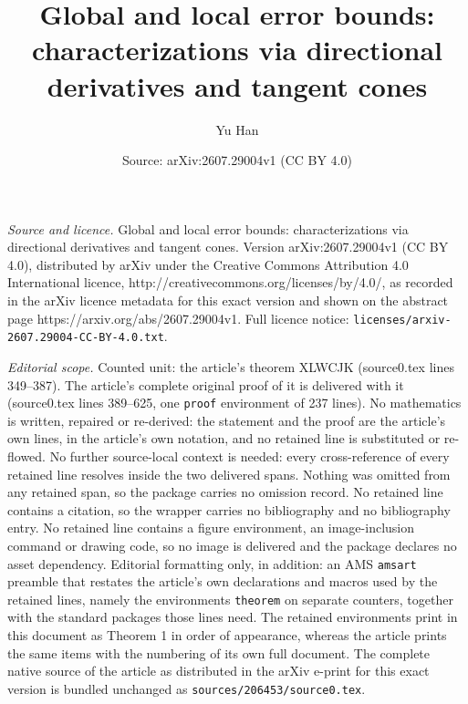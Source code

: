 \documentclass[10pt,a4paper]{amsart}
\title{{Global and local error bounds: characterizations via directional derivatives and tangent cones}}
\author{Yu Han}
\date{Source: arXiv:2607.29004v1 (CC BY 4.0)}
\begin{document}
\maketitle

\noindent\emph{Source and licence.} {Global and local error bounds: characterizations via directional derivatives and tangent cones}. Version arXiv:2607.29004v1 (CC BY 4.0), distributed by arXiv under the Creative Commons Attribution 4.0 International licence, http://creativecommons.org/licenses/by/4.0/, as recorded in the arXiv licence metadata for this exact version and shown on the abstract page https://arxiv.org/abs/2607.29004v1. Full licence notice: \texttt{licenses/arxiv-2607.29004-CC-BY-4.0.txt}.\par\smallskip

\noindent\textit{Editorial scope.} Counted unit: the article's theorem XLWCJK (source0.tex lines 349--387). The article's complete original proof of it is delivered with it (source0.tex lines 389--625, one \texttt{proof} environment of 237 lines). No mathematics is written, repaired or re-derived: the statement and the proof are the article's own lines, in the article's own notation, and no retained line is substituted or re-flowed.  No further source-local context is needed: every cross-reference of every retained line resolves inside the two delivered spans.  Nothing was omitted from any retained span, so the package carries no omission record.  No retained line contains a citation, so the wrapper carries no bibliography and no bibliography entry.  No retained line contains a figure environment, an image-inclusion command or drawing code, so no image is delivered and the package declares no asset dependency.  Editorial formatting only, in addition: an AMS \texttt{amsart} preamble that restates the article's own declarations and macros used by the retained lines, namely the environments \texttt{theorem} on separate counters, together with the standard packages those lines need.  The retained environments print in this document as Theorem 1 in order of appearance, whereas the article prints the same items with the numbering of its own full document.  The complete native source of the article as distributed in the arXiv e-print for this exact version is bundled unchanged as \texttt{sources/206453/source0.tex}.
\end{document}
